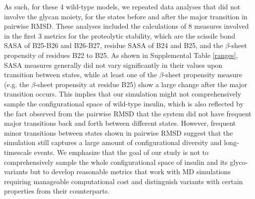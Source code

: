 \documentclass[sn-vancouver]{sn-jnl}
\begin{document}
As such, for these 4 wild-type models, we repeated data analyses that did not involve the glycan moiety, for the states before and after the major transition in pairwise RMSD. These analyses included the calculations of 8 measures involved in the first 3 metrics for the proteolytic stability, which are the scissile bond SASA of B25-B26 and B26-B27, residue SASA of B24 and B25, and the $\beta$-sheet propensity of residues B22 to B25. As shown in Supplemental Table \ref{ranges}, SASA measures generally did not vary significantly in their values upon transition between states, while at least one of the $\beta$-sheet propensity measure (e.g. the $\beta$-sheet propensity at residue B25) show a large change after the major transition occurs. This implies that our simulation might not comprehensively sample the configurational space of wild-type insulin, which is also reflected by the fact observed from the pairwise RMSD that the system did not have frequent major transitions back and forth between different states. However, frequent minor transitions between states shown in pairwise RMSD suggest that the simulation still captures a large amount of configurational diversity and long-timescale events. We emphasize that the goal of our study is not to comprehensively sample the whole configurational space of insulin and its glyco-variants but to develop reasonable metrics that work with MD simulations requiring manageable computational cost and distinguish variants with certain properties from their counterparts.  
\end{document}
